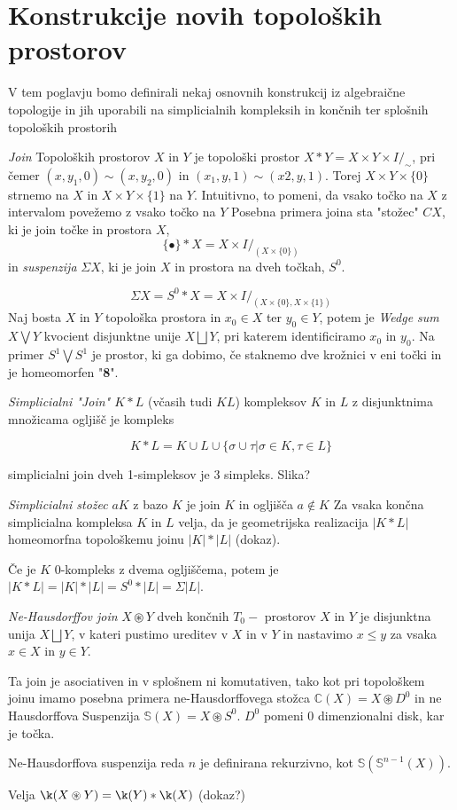 
\section{Konstrukcije novih topoloških prostorov}


V tem poglavju bomo definirali nekaj osnovnih konstrukcij iz algebraične topologije in jih uporabili na simplicialnih kompleksih in končnih ter splošnih topoloških prostorih

\textit{Join} Topoloških prostorov $X$ in $Y$ je topološki prostor $X\ast Y = X\times Y 
\times I /_{\sim}$, pri čemer $(x, y_1, 0) \sim (x, y_2, 0)$ in  $(x_1, y, 1) \sim (x2, y, 1)$. 
Torej $X\times Y\times \{0\}$ strnemo na $X$ in $X\times Y\times \{1\}$ na $Y$. Intuitivno, 
to pomeni, da vsako točko na $X$ z intervalom povežemo z vsako točko na $Y$
Posebna primera joina sta "stožec" $CX$, ki je join točke in prostora $X$, 
$$\{\bullet\}\ast X=X\times I /_{(X\times \{0\})}$$
in \textit{suspenzija} $\Sigma X$, ki je join $X$ in prostora na dveh točkah, $S^0$.

$$
\Sigma X=S^0\ast X = X\times I /_{(X\times \{0\},X\times \{1\})}
$$
Naj bosta $X$ in $Y$ topološka prostora in $x_0\in X$ ter $y_0\in Y$, potem je 
\textit{Wedge sum} $X\bigvee Y$ kvocient disjunktne unije $X\bigsqcup Y$, pri
 katerem identificiramo $x_0$ in $y_0$. Na primer $S^1\bigvee S^1$ je prostor,
  ki ga dobimo, če staknemo dve krožnici v eni točki in je homeomorfen "\textbf{8}".




\textit{Simplicialni "Join" $K\ast L$} (včasih tudi $KL$) kompleksov $K$ in $L$ z disjunktnima množicama ogljišč je kompleks

$$
K\ast L=K\cup L \cup \{\sigma \cup \tau| \sigma \in K, \tau \in L \}
$$

\begin{primer}
    simplicialni join dveh 1-simpleksov je 3 simpleks. Slika?
\end{primer}

\textit{Simplicialni stožec} $aK$ z bazo $K$ je join $K$ in ogljišča $a\notin K$
Za vsaka končna simplicialna kompleksa $K$ in $L$ velja, da je geometrijska realizacija $|K\ast L|$ homeomorfna topološkemu joinu $|K|\ast |L|$ (dokaz).

Če je $K$ 0-kompleks z dvema ogljiščema, potem je $|K\ast L|=|K|\ast |L|=S^0\ast |L| = \Sigma |L|$.

\begin{definicija}
    \textit{Ne-Hausdorffov join} $X\circledast Y$ dveh končnih $T_0-$
    prostorov $X$ in $Y$ je disjunktna unija $X\bigsqcup Y$, v kateri
     pustimo ureditev v $X$ in v $Y$ in nastavimo $x\leq y$ za vsaka 
     $x\in X$ in $y\in Y$.
\end{definicija}
Ta join je asociativen in v splošnem ni komutativen, tako kot pri topološkem
 joinu imamo posebna primera ne-Hausdorffovega stožca $\mathds{C}(X)=X\circledast
  D^0$ in ne Hausdorffova Suspenzija $\mathds{S}(X)=X \circledast S^0$. 
  $D^0$ pomeni 0 dimenzionalni disk, kar je točka.

  Ne-Hausdorffova suspenzija reda $n$ je definirana rekurzivno, kot $\mathds{S}(\mathds{S}^{n-1}(X))$.
  \begin{opomba}
    \label{op:join}
    Velja $\k(X\circledast Y) = \k(Y)\ast \k(X)$ (dokaz?)
  \end{opomba}
